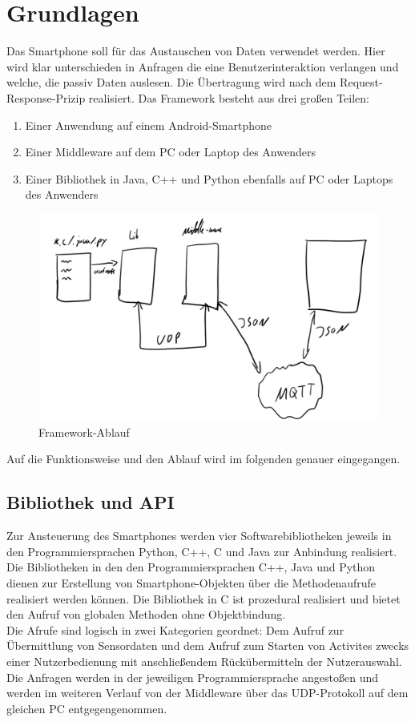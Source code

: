 \documentclass[11pt,a4paper]{report}
\begin{document}
\chapter{Grundlagen} \label{chap:grundlagen}
Das Smartphone soll für das Austauschen von Daten verwendet werden.
Hier wird klar unterschieden in Anfragen die eine Benutzerinteraktion verlangen und welche, die passiv Daten auslesen.
Die Übertragung wird nach dem Request-Response-Prizip realisiert.
Das Framework besteht aus drei großen Teilen:
\begin{enumerate}
  \item Einer Anwendung auf einem Android-Smartphone
  \item Einer Middleware auf dem PC oder Laptop des Anwenders
  \item Einer Bibliothek in Java, C++ und Python ebenfalls auf PC oder Laptops des Anwenders
\end{enumerate}
\begin{figure}[htbp]
  \centering
  \includegraphics[width=.9\textwidth]{images/design.png}
  \caption{Framework-Ablauf}
  \label{fig:Ablauf}
\end{figure}
Auf die Funktionsweise und den Ablauf wird im folgenden genauer eingegangen.

\section*{Bibliothek und API}
Zur Ansteuerung des Smartphones werden vier Softwarebibliotheken jeweils in den Programmiersprachen Python, C++, C und Java zur Anbindung realisiert.
Die Bibliotheken in den den Programmiersprachen C++, Java und Python dienen zur Erstellung von Smartphone-Objekten über die Methodenaufrufe realisiert werden können.
Die Bibliothek in C ist prozedural realisiert und bietet den Aufruf von globalen Methoden ohne Objektbindung.
\\
Die Afrufe sind logisch in zwei Kategorien geordnet: Dem Aufruf zur Übermittlung von Sensordaten und dem Aufruf zum Starten von Activites zwecks einer Nutzerbedienung mit anschließendem Rückübermitteln der Nutzerauswahl.
\\
Die Anfragen werden in der jeweiligen Programmiersprache angestoßen und werden im weiteren Verlauf von der Middleware über das UDP-Protokoll auf dem gleichen PC entgegengenommen.
\end{document}
